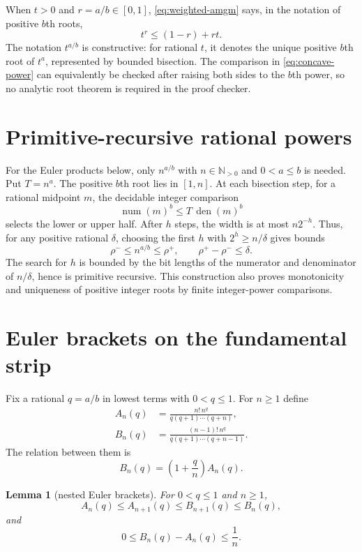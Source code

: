 \documentclass[11pt]{article}
\newtheorem{lemma}[theorem]{Lemma}
\newcommand{\N}{\mathbb N}
\begin{document}
When $t>0$ and $r=a/b\in[0,1]$, \eqref{eq:weighted-amgm} says, in the notation
of positive $b$th roots,
\begin{equation}
 t^r\le (1-r)+rt.
 \label{eq:concave-power}
\end{equation}
The notation $t^{a/b}$ is constructive: for rational $t$, it denotes the
unique positive $b$th root of $t^a$, represented by bounded bisection.  The
comparison in \eqref{eq:concave-power} can equivalently be checked after
raising both sides to the $b$th power, so no analytic root theorem is required
in the proof checker.

\section{Primitive-recursive rational powers}
\label{sec:roots}

For the Euler products below, only $n^{a/b}$ with $n\in\N_{>0}$ and
$0<a\le b$ is needed.  Put $T=n^a$.  The positive $b$th root lies in $[1,n]$.
At each bisection step, for a rational midpoint $m$, the decidable integer
comparison
\[
 \operatorname{num}(m)^b
 \le T\,\operatorname{den}(m)^b
\]
selects the lower or upper half.  After $h$ steps, the width is at most
$n2^{-h}$.  Thus, for any positive rational $\delta$, choosing the first
$h$ with $2^h\ge n/\delta$ gives bounds
\[
 \rho^-\le n^{a/b}\le\rho^+,
 \qquad \rho^+-\rho^-\le\delta.
\]
The search for $h$ is bounded by the bit lengths of the numerator and
denominator of $n/\delta$, hence is primitive recursive.  This construction
also proves monotonicity and uniqueness of positive integer roots by finite
integer-power comparisons.

\section{Euler brackets on the fundamental strip}
\label{sec:strip}

Fix a rational $q=a/b$ in lowest terms with $0<q\le1$.  For $n\ge1$ define
\begin{align}
 A_n(q)&=\frac{n!\,n^q}{q(q+1)\cdots(q+n)},
 \label{eq:An}\\
 B_n(q)&=\frac{(n-1)!\,n^q}{q(q+1)\cdots(q+n-1)}.
 \label{eq:Bn}
\end{align}
The relation between them is
\begin{equation}
 B_n(q)=\left(1+\frac qn\right)A_n(q).
 \label{eq:BoverA}
\end{equation}

\begin{lemma}[nested Euler brackets]
For $0<q\le1$ and $n\ge1$,
\begin{equation}
 A_n(q)\le A_{n+1}(q)\le B_{n+1}(q)\le B_n(q),
 \label{eq:nesting}
\end{equation}
and
\begin{equation}
 0\le B_n(q)-A_n(q)\le\frac1n.
 \label{eq:width}
\end{equation}
\end{lemma}
\end{document}
